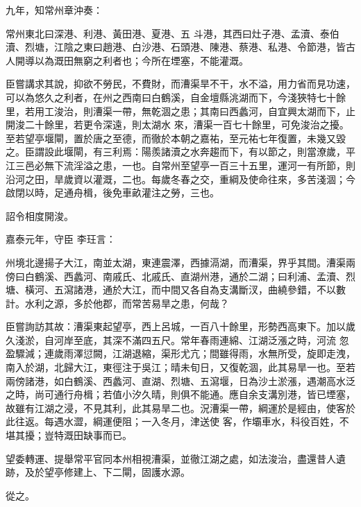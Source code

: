 \begin{pinyinscope}
 九年，知常州章沖奏：



 常州東北曰深港、利港、黃田港、夏港、五
 斗港，其西曰灶子港、孟瀆、泰伯瀆、烈塘，江陰之東曰趙港、白沙港、石頭港、陳港、蔡港、私港、令節港，皆古人開導以為溉田無窮之利者也；今所在堙塞，不能灌溉。



 臣嘗講求其說，抑欲不勞民，不費財，而漕渠旱不干，水不溢，用力省而見功速，可以為悠久之利者，在州之西南曰白鶴溪，自金壇縣洮湖而下，今淺狹特七十餘里，若用工浚治，則漕渠一帶，無乾涸之患；其南曰西蠡河，自宜興太湖而下，止開浚二十餘里，若更令深遠，則太湖水
 來，漕渠一百七十餘里，可免浚治之擾。至若望亭堰閘，置於唐之至德，而徹於本朝之嘉祐，至元祐七年復置，未幾又毀之。臣謂設此堰閘，有三利焉：陽羨諸瀆之水奔趨而下，有以節之，則當潦歲，平江三邑必無下流淫溢之患，一也。自常州至望亭一百三十五里，運河一有所節，則沿河之田，旱歲資以灌溉，二也。每歲冬春之交，重綱及使命往來，多苦淺涸；今啟閉以時，足通舟楫，後免車畝灌注之勞，三也。



 詔令相度開浚。



 嘉泰元年，守臣
 李玨言：



 州境北邊揚子大江，南並太湖，東連震澤，西據滆湖，而漕渠，界乎其間。漕渠兩傍曰白鶴溪、西蠡河、南戚氏、北戚氏、直湖州港，通於二湖；曰利浦、孟瀆、烈塘、橫河、五瀉諸港，通於大江，而中間又各自為支溝斷汊，曲繞參錯，不以數計。水利之源，多於他郡，而常苦易旱之患，何哉？



 臣嘗詢訪其故：漕渠東起望亭，西上呂城，一百八十餘里，形勢西高東下。加以歲久淺淤，自河岸至底，其深不滿四五尺。常年春雨連綿、江湖泛漲之時，河流
 忽盈驟減；連歲雨澤愆闕，江湖退縮，渠形尤亢；間雖得雨，水無所受，旋即走洩，南入於湖，北歸大江，東徑注于吳江；晴未旬日，又復乾涸，此其易旱一也。至若兩傍諸港，如白鶴溪、西蠡河、直湖、烈塘、五瀉堰，日為沙土淤漲，遇潮高水泛之時，尚可通行舟楫；若值小汐久晴，則俱不能通。應自余支溝別港，皆已堙塞，故雖有江湖之浸，不見其利，此其易旱二也。況漕渠一帶，綱運於是經由，使客於此往返。每遇水澀，綱運便阻；一入冬月，津送使
 客，作壩車水，科役百姓，不堪其擾；豈特溉田缺事而已。



 望委轉運、提舉常平官同本州相視漕渠，並徹江湖之處，如法浚治，盡還昔人遺跡，及於望亭修建上、下二閘，固護水源。



 從之。




\end{pinyinscope}
